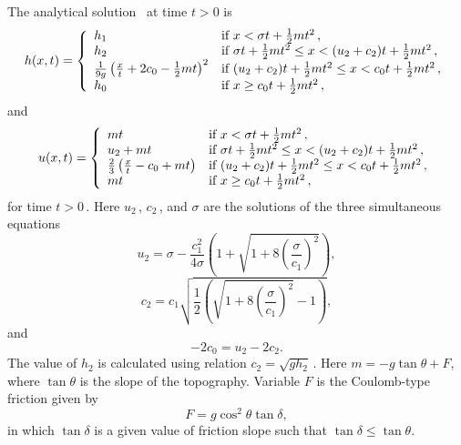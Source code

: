 The analytical solution~\cite{MR2012PAAG} at time $t>0$ is
\begin{equation}
h(x,t) = \left\{ \begin{array}{ll}
h_1 & \textrm{if $x < \sigma t + \frac12 mt^2$}\,,\\
h_2 & \textrm{if $ \sigma t + \frac12 mt^2 \leq x < (u_2+c_2)t + \frac12 mt^2$}\,,\\
\frac{1}{9g} \left( \frac{x}{t} + 2c_0 - \frac12 mt \right)^2 & \textrm{if $(u_2+c_2)t + \frac12 mt^2 \leq x < c_0 t + \frac12 mt^2$}\,,\\
h_0 & \textrm{if $x \geq c_0 t + \frac12 mt^2$}\,, \\
\end{array} \right.
\end{equation}
and
\begin{equation}
u(x,t) = \left\{ \begin{array}{ll}
mt & \textrm{if $x < \sigma t + \frac12 mt^2$}\,,\\
u_2+mt & \textrm{if $ \sigma t + \frac12 mt^2 \leq x < (u_2+c_2)t + \frac12 mt^2$}\,,\\
\frac23 \left( \frac{x}{t} - c_0 + mt \right) & \textrm{if $(u_2+c_2)t + \frac12 mt^2 \leq x < c_0 t + \frac12 mt^2$}\,,\\
mt & \textrm{if $x \geq c_0 t + \frac12 mt^2$}\,, \\ \end{array} \right.
\end{equation}
for time $t>0$\,. Here $u_2$\,, $c_2$\,, and $\sigma$ are the solutions of the three simultaneous equations 
\begin{equation}
u_2  = \sigma - \frac{c_1^2}{4\sigma} \left(1+\sqrt{1+8\left( \frac{\sigma}{c_1} \right)^2}     \right),
\end{equation}
\begin{equation}
c_2 = c_1 \sqrt{\frac12 \left(\sqrt{1+  8 \left(\frac{\sigma}{c_1}\right)^2}-1  \right)},
\end{equation}
and 
\begin{equation}
-2c_0 = u_2 -2c_2.
\end{equation} 
The value of $h_2$ is calculated using relation $c_2=\sqrt{gh_2}$\,.
Here $m=-g\tan{\theta}+F$, where $\tan{\theta}$ is the slope of the topography. Variable $F$ is the Coulomb-type friction given by 
\begin{equation}
F=g \cos^2{\theta} \tan{\delta},
\end{equation}
in which $\tan{\delta}$ is a given value of friction slope such that $\tan{\delta} \leq \tan{\theta}$. 



